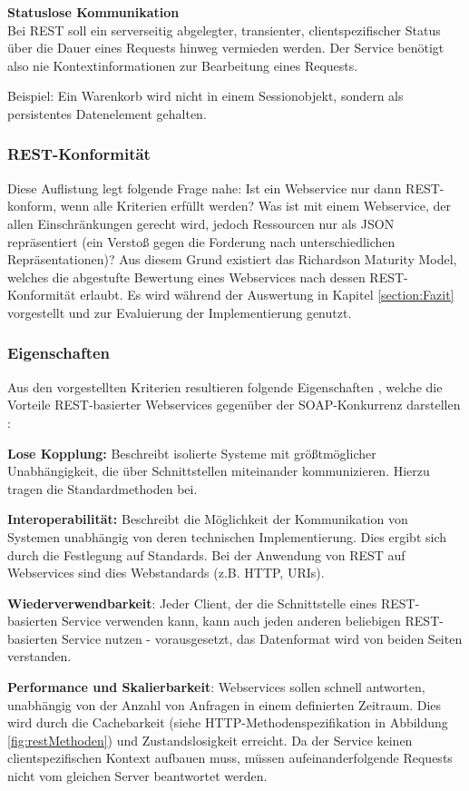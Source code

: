 \documentclass[11pt, a4paper, titlepage, listof=totoc, bibliography=totoc, index=totoc, twoside, openright, headings=normal, draft]{scrreprt}
\begin{document}
\textbf{Statuslose Kommunikation}\\
Bei REST soll ein serverseitig abgelegter, transienter, clientspezifischer Status über die Dauer eines Requests hinweg vermieden werden. Der Service benötigt also nie Kontextinformationen zur Bearbeitung eines Requests.

Beispiel: Ein Warenkorb wird nicht in einem Sessionobjekt, sondern als persistentes Datenelement gehalten.

\subsubsection{REST-Konformität}
\label{REST-Konformität}
Diese Auflistung legt folgende Frage nahe: Ist ein Webservice nur dann REST-konform, wenn alle Kriterien erfüllt werden? Was ist mit einem Webservice, der allen Einschränkungen gerecht wird, jedoch Ressourcen nur als JSON repräsentiert (ein Verstoß gegen die Forderung nach unterschiedlichen Repräsentationen)? Aus diesem Grund existiert das \glqq Richardson Maturity Model\grqq{}, welches die abgestufte Bewertung eines Webservices nach dessen REST-Konformität erlaubt. Es wird während der Auswertung in Kapitel \ref{section:Fazit} vorgestellt und zur Evaluierung der Implementierung genutzt.

\subsubsection{Eigenschaften}
\label{REST-Eigenschaften}
Aus den vorgestellten Kriterien resultieren folgende Eigenschaften \citep{tilkov11},  welche die Vorteile REST-basierter Webservices gegenüber der SOAP-Konkurrenz darstellen \citep{richardson07}:

\begin{compactitem}
\item [\textbf{Lose Kopplung:}] Beschreibt isolierte Systeme mit größtmöglicher Unabhängigkeit, die über Schnittstellen miteinander kommunizieren. Hierzu tragen die Standardmethoden bei.
\item [\textbf{Interoperabilität:}] Beschreibt die Möglichkeit der Kommunikation von Systemen unabhängig von deren technischen Implementierung. Dies ergibt sich durch die Festlegung auf Standards. Bei der Anwendung von REST auf Webservices sind dies Webstandards (z.B. HTTP, URIs).
\item [\textbf{Wiederverwendbarkeit}:] Jeder Client, der die Schnittstelle eines REST-basierten Service verwenden kann, kann auch jeden anderen beliebigen REST-basierten Service nutzen - vorausgesetzt, das Datenformat wird von beiden Seiten verstanden.
\item [\textbf{Performance und Skalierbarkeit}:] Webservices sollen schnell antworten, unabhängig von der Anzahl von Anfragen in einem definierten Zeitraum. Dies wird durch die Cachebarkeit (siehe HTTP-Methodenspezifikation in Abbildung \ref{fig:restMethoden}) und Zustandslosigkeit erreicht. Da der Service keinen clientspezifischen Kontext aufbauen muss, müssen aufeinanderfolgende Requests nicht vom gleichen Server beantwortet werden.
\end{compactitem}
\pagebreak
\end{document}

